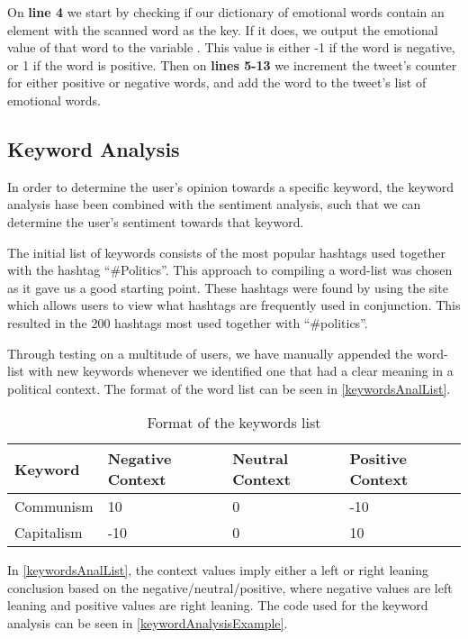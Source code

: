 On \textbf{line 4} we start by checking if our dictionary of emotional words
contain an element with the scanned word as the key. If it does, we output the
emotional value of that word to the variable . This value is
either -1 if the word is negative, or 1 if the word is positive. Then on
\textbf{lines 5-13} we increment the tweet's counter for either positive or
negative words, and add the word to the tweet's list of emotional words.

\subsection{Keyword Analysis}
In order to determine the user's opinion towards a specific keyword, the keyword
analysis hase been combined with the sentiment analysis, such that we can
determine the user's sentiment towards that keyword.

The initial list of keywords consists of the most popular hashtags used together
with the hashtag ``\#Politics''. This approach to compiling a word-list was
chosen as it gave us a good starting point. These hashtags were found by using
the site  which allows users to
view what hashtags are frequently used in conjunction. This resulted in the 200 hashtags most used
together with ``\#politics''.\nl

Through testing on a multitude of users, we have manually appended the word-list
with new keywords whenever we identified one that had a clear meaning in a
political context. The format of the word list can be seen in
\autoref{keywordsAnalList}.\\

\begin{table}[H]
\begin{tabular}{|l|l|l|l|}
\textbf{Keyword} & \textbf{Negative Context} & \textbf{Neutral Context} & \textbf{Positive Context} \\\hline
Communism & 10 & 0 & -10 \\\hline
Capitalism & -10 & 0 & 10 \\\hline
\end{tabular}
\caption{Format of the keywords list}
\label{keywordsAnalList}
\end{table} 

In \autoref{keywordsAnalList}, the context values imply either a left or
right leaning conclusion based on the negative/neutral/positive, where negative
values are left leaning and positive values are right leaning. The code used for
the keyword analysis can be seen in \autoref{keywordAnalysisExample}.\\

